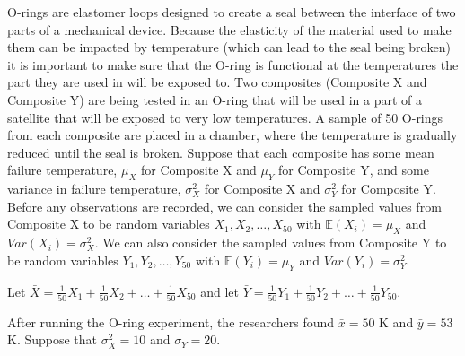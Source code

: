 \documentclass[addpoints]{examsetup}
\begin{document}
\begin{questions}
\newpage

\question
O-rings are elastomer loops designed to create a seal between the interface of two parts of a mechanical device.
Because the elasticity of the material used to make them can be impacted by temperature (which can lead to the seal being broken) it is important to make sure that the O-ring is functional at the temperatures the part they are used in will be exposed to.
Two composites (Composite X and Composite Y) are being tested in an O-ring that will be used in a part of a satellite that will be exposed to very low temperatures.
A sample of 50 O-rings from each composite are placed in a chamber, where the temperature is gradually reduced until the seal is broken.
Suppose that each composite has some mean failure temperature, $\mu_X$ for Composite X and $\mu_Y$ for Composite Y, and some variance in failure temperature, 
$\sigma_X^2$ for Composite X and $\sigma_Y^2$ for Composite Y. 
Before any observations are recorded, we can consider the sampled values from Composite X to be random variables $X_1, X_2, \ldots, X_{50}$ with $\mathbb{E}(X_i) = \mu_X$ and $Var(X_i) = \sigma_X^2$.
We can also consider the sampled values from Composite Y to be random variables $Y_1, Y_2, \ldots, Y_{50}$ with $\mathbb{E}(Y_i) = \mu_Y$ and $Var(Y_i) = \sigma_Y^2$.

Let $\bar{X} = \frac{1}{50} X_1 + \frac{1}{50} X_2 + \ldots + \frac{1}{50} X_{50}$ and let $\bar{Y} = \frac{1}{50} Y_1 + \frac{1}{50} Y_2 + \ldots + \frac{1}{50} Y_{50}$.




   After running the O-ring experiment, the researchers found $\bar{x} = 50$ K and $\bar{y} = 53$ K. 
   Suppose that $\sigma_X^2 = 10$ and $\sigma_Y = 20$.
\end{questions}
\end{document}
